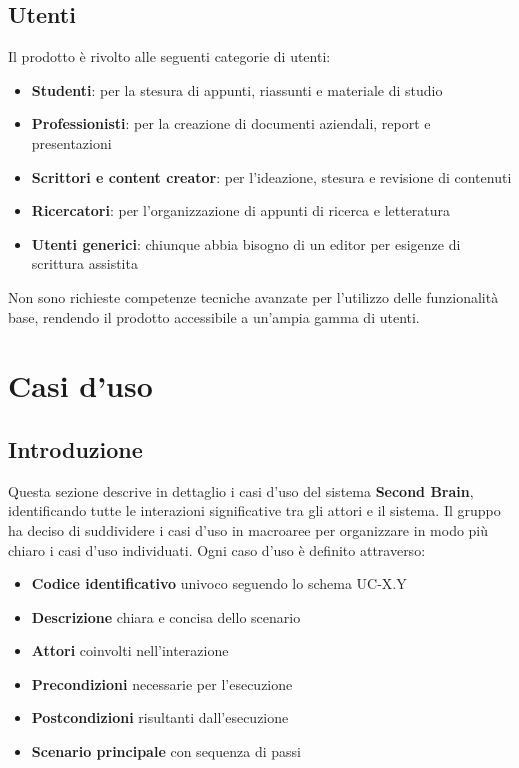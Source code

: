 \documentclass[11pt,a4paper]{article}
\begin{document}
\subsection{Utenti}
Il prodotto è rivolto alle seguenti categorie di utenti:

\begin{itemize}
    \item \textbf{Studenti}: per la stesura di appunti, riassunti e materiale di studio
    \item \textbf{Professionisti}: per la creazione di documenti aziendali, report e presentazioni
    \item \textbf{Scrittori e content creator}: per l'ideazione, stesura e revisione di contenuti
    \item \textbf{Ricercatori}: per l'organizzazione di appunti di ricerca e letteratura
    \item \textbf{Utenti generici}: chiunque abbia bisogno di un editor per esigenze di scrittura assistita
\end{itemize}

Non sono richieste competenze tecniche avanzate per l'utilizzo delle funzionalità base, rendendo il prodotto accessibile a un'ampia gamma di utenti.

\newpage

\section{Casi d'uso}
\subsection{Introduzione}
Questa sezione descrive in dettaglio i casi d'uso del sistema \textbf{Second Brain}, identificando tutte le interazioni significative tra gli attori e il sistema. Il gruppo ha deciso di suddividere i casi d'uso in macroaree per organizzare in modo più chiaro i casi d'uso individuati. Ogni caso d'uso è definito attraverso:

\begin{itemize}
    \item \textbf{Codice identificativo} univoco seguendo lo schema UC-X.Y
    \item \textbf{Descrizione} chiara e concisa dello scenario
    \item \textbf{Attori} coinvolti nell'interazione
    \item \textbf{Precondizioni} necessarie per l'esecuzione
    \item \textbf{Postcondizioni} risultanti dall'esecuzione
    \item \textbf{Scenario principale} con sequenza di passi
\end{itemize}
\end{document}
